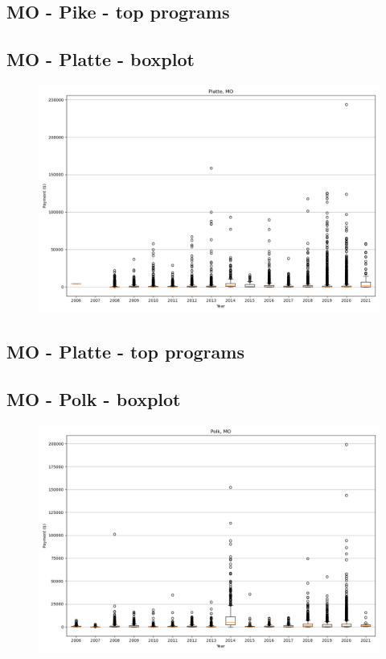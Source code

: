 \subsection*{MO - Pike - top programs}

\newpage
\subsection*{MO - Platte - boxplot}
\begin{figure}[h]
\centering
\includegraphics[width=7in]{../output/boxplots/counties/Platte-MO_boxplot.png}
\end{figure}


\subsection*{MO - Platte - top programs}

\newpage
\subsection*{MO - Polk - boxplot}
\begin{figure}[h]
\centering
\includegraphics[width=7in]{../output/boxplots/counties/Polk-MO_boxplot.png}
\end{figure}


